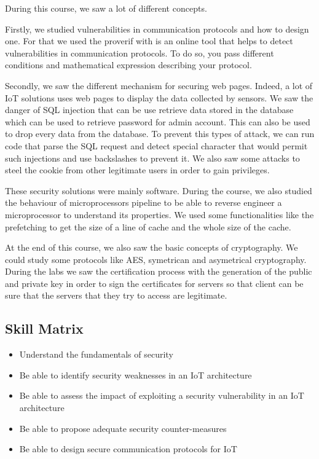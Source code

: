 During this course, we saw a lot of different concepts.
\\\par
Firstly, we studied vulnerabilities in communication protocols and how to design one. For that we used the proverif with is an online tool that helps to detect vulnerabilities in communication protocols. To do so, you pass different conditions and mathematical expression describing your protocol.
\\\par
Secondly, we saw the different mechanism for securing web pages. Indeed, a lot of IoT solutions uses web pages to display the data collected by sensors. We saw the danger of SQL injection that can be use retrieve data stored in the database which can be used to retrieve password for admin account. This can also be used to drop every data from the database. To prevent this types of attack, we can run code that parse the SQL request and detect special character that would permit such injections and use backslashes to prevent it. We also saw some attacks to steel the cookie from other legitimate users in order to gain privileges. 
\\\par
These security solutions were mainly software. During the course, we also studied the behaviour of microprocessors pipeline to be able to reverse engineer a microprocessor to understand its properties. We used some functionalities like the prefetching to get the size of a line of cache and the whole size of the cache. 
\\\par
At the end of this course, we also saw the basic concepts of cryptography. We could study some protocols like AES, symetrican and asymetrical cryptography. During the labs we saw the certification process with the generation of the public and private key in order to sign the certificates for servers so that client can be sure that the servers that they try to access are legitimate.

\subsection{Skill Matrix}
\begin{itemize}
    \item Understand the fundamentals of security
    \item Be able to identify security weaknesses in an IoT architecture
    \item Be able to assess the impact of exploiting a security vulnerability in an IoT architecture
    \item Be able to propose adequate security counter-measures
    \item Be able to design secure communication protocols for IoT
\end{itemize}

